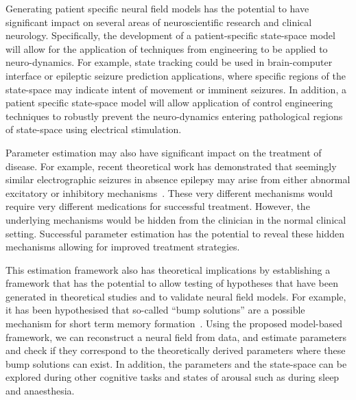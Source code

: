 \documentclass[10pt,a4paper]{article}
\begin{document}
Generating patient specific neural field models has the potential to have significant impact on several areas of neuroscientific research and clinical neurology. Specifically, the development of a patient-specific state-space model will allow for the application of techniques from engineering to be applied to neuro-dynamics. For example, state tracking could be used in brain-computer interface or epileptic seizure prediction applications, where specific regions of the state-space may indicate intent of movement or imminent seizures. In addition, a patient specific state-space model will allow application of control engineering techniques to robustly prevent the neuro-dynamics entering pathological regions of state-space using electrical stimulation. 

Parameter estimation may also have significant impact on the treatment of disease. For example, recent theoretical work has demonstrated that seemingly similar electrographic seizures in absence epilepsy may arise from either abnormal excitatory or inhibitory mechanisms~\cite{Marten2009}. These very different mechanisms would require very different medications for successful treatment. However, the underlying mechanisms would be hidden from the clinician in the normal clinical setting. Successful parameter estimation has the potential to reveal these hidden mechanisms allowing for improved treatment strategies. 

This estimation framework also has theoretical implications by establishing a framework that has the potential to allow testing of hypotheses that have been generated in theoretical studies and to validate neural field models. For example, it has been hypothesised that so-called ``bump solutions'' are a possible mechanism for short term memory formation~\cite{Coombes2005}. Using the proposed model-based framework, we can reconstruct a neural field from data, and estimate parameters and check if they correspond to the theoretically derived parameters where these bump solutions can exist. In addition, the parameters and the state-space can be explored during other cognitive tasks and states of arousal such as during sleep and anaesthesia. 
\end{document}
